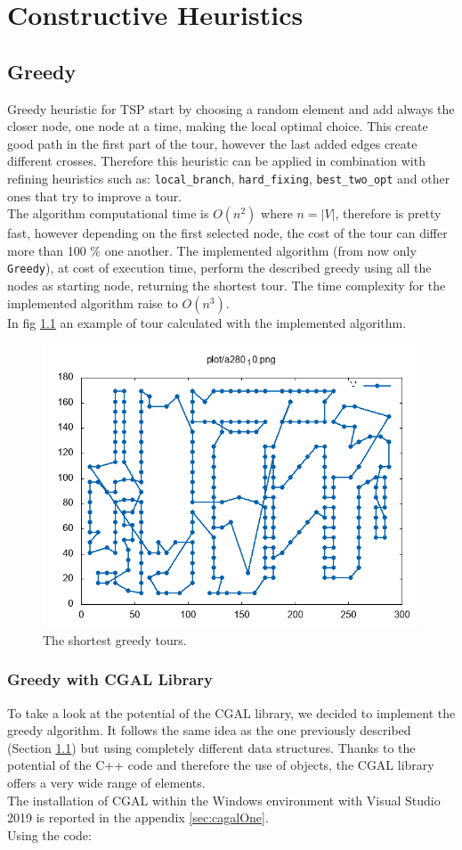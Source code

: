 \chapter{Constructive Heuristics}

\section{Greedy}\label{sec:greedy}
Greedy heuristic for TSP start by choosing a random element and add always the closer node, one node at a time, making the local optimal choice. This create good path in the first part of the tour, however the last added edges create different crosses. Therefore this heuristic can be applied in combination with refining heuristics such as: \texttt{local\_branch}, \texttt{hard\_fixing}, \texttt{best\_two\_opt} and other ones that try to improve a tour.\\
The algorithm computational time is $ O(n^2) $ where $ n = |V| $, therefore is pretty fast, however depending on the first selected node, the cost of the tour can differ more than 100 \% one another. The implemented algorithm (from now only \texttt{Greedy}), at cost of execution time, perform the described greedy using all the nodes as starting node, returning the shortest tour. The time complexity for the implemented algorithm raise to $ O(n^3) $.\\
In fig \ref{fig:a280_10_} an example of tour calculated with the implemented algorithm.

\begin{figure}[h]
	\centering
	\centering
	\includegraphics[width=0.7\columnwidth]{../res/a280_10.png}
	\caption{The shortest greedy tours.}
	\label{fig:a280_10_}
\end{figure}



\subsection{Greedy with CGAL Library}
To take a look at the potential of the CGAL library, we decided to implement the greedy algorithm. It follows the same idea as the one previously described (Section \ref{sec:greedy}) but using completely different data structures. Thanks to the potential of the C++ code and therefore the use of objects, the CGAL library offers a very wide range of elements.\\ 
The installation of CGAL within the Windows environment with Visual Studio 2019 is reported in the appendix \ref{sec:cagalOne}.\\
Using the code:

